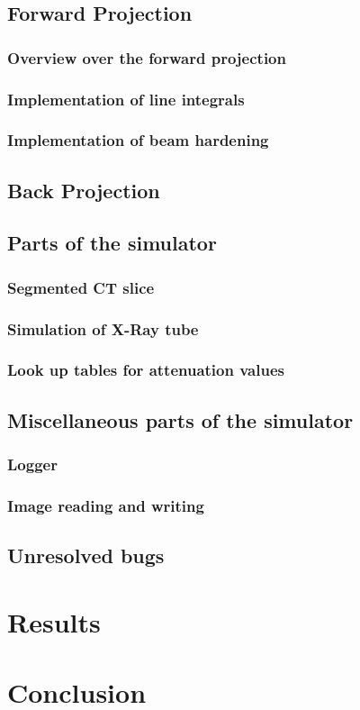 \documentclass{acm_proc_article-sp}
\begin{document}
\subsection{Forward Projection}
\subsubsection{Overview over the forward projection}
\subsubsection{Implementation of line integrals}
\subsubsection{Implementation of beam hardening}
\subsection{Back Projection}
\subsection{Parts of the simulator}
\subsubsection{Segmented CT slice}
\subsubsection{Simulation of X-Ray tube}
\subsubsection{Look up tables for attenuation values}
\subsection{Miscellaneous parts of the simulator}
\subsubsection{Logger}
\subsubsection{Image reading and writing}
\subsection{Unresolved bugs}

\section{Results}

\section{Conclusion}
\end{document}
